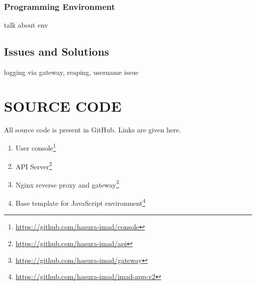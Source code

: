 \documentclass[DD]{iitmdiss}
\begin{document}
\subsection{Programming Environment}
talk about env

\section{Issues and Solutions}
logging via gateway, reaping, username issue

\appendix

\chapter{SOURCE CODE}

All source code is present in GitHub. Links are given here.
\begin{enumerate}
	\item User console\footnote{\url{https://github.com/hasura-imad/console}}
	\item API Server\footnote{\url{https://github.com/hasura-imad/api}}
	\item Nginx reverse proxy and gateway\footnote{\url{https://github.com/hasura-imad/gateway}}
	\item Base template for JavaScript environment\footnote{\url{https://github.com/hasura-imad/imad-app-v2}}
\end{enumerate}


\begin{singlespace}
	
\end{singlespace}



%
\end{document}

